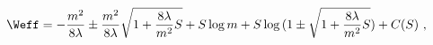 \begin{equation}
\label{eq:Weff1}
\Weff=-\frac{m^2}{8\lambda} \pm \frac{m^2}{8\lambda}\sqrt{1+\frac{8 \lambda}
{m^2}S}+S\log{m}+S\log{(1 \pm \sqrt{1+\frac{8 \lambda}{m^2}S})}+C(S) ~,
\end{equation}


